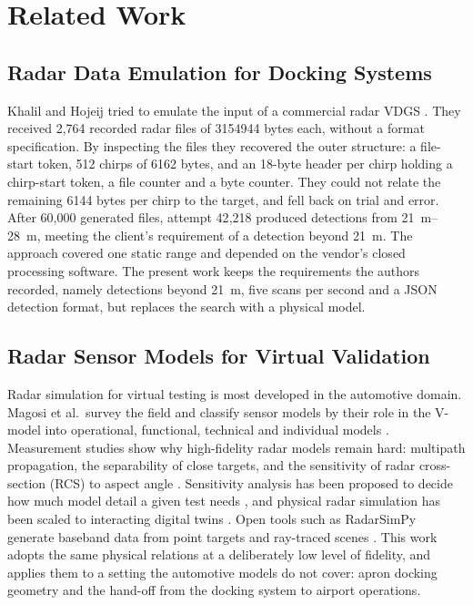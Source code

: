 \documentclass[conference]{IEEEtran}
\begin{document}
\section{Related Work}
\label{sec:related}

\subsection{Radar Data Emulation for Docking Systems}
Khalil and Hojeij tried to emulate the input of a commercial radar VDGS \cite{khalil2020radar}. They received 2{,}764 recorded radar files of \num{3154944} bytes each, without a format specification. By inspecting the files they recovered the outer structure: a file-start token, 512 chirps of \num{6162} bytes, and an 18-byte header per chirp holding a chirp-start token, a file counter and a byte counter. They could not relate the remaining \num{6144} bytes per chirp to the target, and fell back on trial and error. After 60{,}000 generated files, attempt 42{,}218 produced detections from \SIrange{21}{28}{\metre}, meeting the client's requirement of a detection beyond \SI{21}{\metre}. The approach covered one static range and depended on the vendor's closed processing software. The present work keeps the requirements the authors recorded, namely detections beyond \SI{21}{\metre}, five scans per second and a JSON detection format, but replaces the search with a physical model.

\subsection{Radar Sensor Models for Virtual Validation}
Radar simulation for virtual testing is most developed in the automotive domain. Magosi et al.\ survey the field and classify sensor models by their role in the V-model into operational, functional, technical and individual models \cite{magosi2022survey}. Measurement studies show why high-fidelity radar models remain hard: multipath propagation, the separability of close targets, and the sensitivity of radar cross-section (RCS) to aspect angle \cite{holder2018challenges}. Sensitivity analysis has been proposed to decide how much model detail a given test needs \cite{ngo2020sensitivity}, and physical radar simulation has been scaled to interacting digital twins \cite{thieling2021scalable}. Open tools such as RadarSimPy generate baseband data from point targets and ray-traced scenes \cite{radarsimpy}. This work adopts the same physical relations at a deliberately low level of fidelity, and applies them to a setting the automotive models do not cover: apron docking geometry and the hand-off from the docking system to airport operations.
\end{document}
